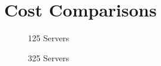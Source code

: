 \documentclass[thesis,proposal]{umassthesis}  %
\begin{document}
\section{Cost Comparisons}

\begin{figure}
	\begin{minipage}{0.49\textwidth}
        \caption{125 Servers}\label{Fig:125servercost}
    \end{minipage}
    \begin{minipage}{0.49\textwidth}
        \caption{325 Servers}\label{Fig:325servercost}
    \end{minipage}
\end{figure}
\end{document}

